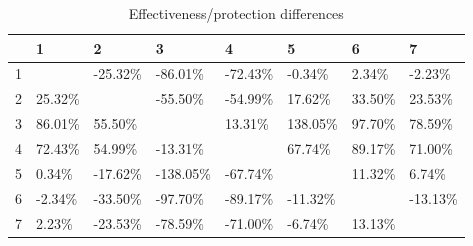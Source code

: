 \begin{table}[ht]
\centering
\begin{tabular}{rlllllll}
  \hline
 & 1 & 2 & 3 & 4 & 5 & 6 & 7 \\ 
  \hline
1 &  & -25.32\% & -86.01\% & -72.43\% & -0.34\% & 2.34\% & -2.23\% \\ 
  2 & 25.32\% &  & -55.50\% & -54.99\% & 17.62\% & 33.50\% & 23.53\% \\ 
  3 & 86.01\% & 55.50\% &  & 13.31\% & 138.05\% & 97.70\% & 78.59\% \\ 
  4 & 72.43\% & 54.99\% & -13.31\% &  & 67.74\% & 89.17\% & 71.00\% \\ 
  5 & 0.34\% & -17.62\% & -138.05\% & -67.74\% &  & 11.32\% & 6.74\% \\ 
  6 & -2.34\% & -33.50\% & -97.70\% & -89.17\% & -11.32\% &  & -13.13\% \\ 
  7 & 2.23\% & -23.53\% & -78.59\% & -71.00\% & -6.74\% & 13.13\% &  \\ 
   \hline
\end{tabular}
\caption{Effectiveness/protection differences} 
\end{table}
